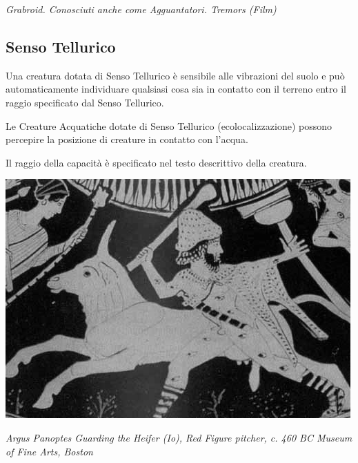 \begin{multicols}{2}
\begin{center}
\medskip

\emph{Grabroid. Conosciuti anche come Agguantatori. Tremors (Film)}
\end{center}


\subsection{Senso Tellurico}\label{sensotellurico}
Una creatura dotata di Senso Tellurico è sensibile alle vibrazioni del suolo e può automaticamente individuare qualsiasi cosa sia in contatto con il terreno entro il raggio specificato dal Senso Tellurico.

Le Creature Acquatiche dotate di Senso Tellurico (ecolocalizzazione) possono percepire la posizione di creature in contatto con l'acqua.

Il raggio della capacità è specificato nel testo descrittivo della creatura.

\end{multicols}

\vfill

\begin{center}
	\includegraphics[width=0.75\linewidth]{immagini/argus2.png}
	
	\emph{Argus Panoptes Guarding the Heifer (Io), Red Figure pitcher, c. 460 BC Museum of Fine Arts, Boston}
\end{center}




\pagebreak

